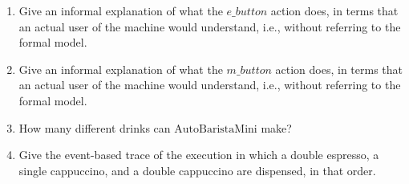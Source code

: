 \documentclass[12pt,fleqn]{article}
\begin{document}
\begin{enumerate}
\begin{enumerate}
\vspace*{1in} %



\item Give an informal explanation of what the $e\_button$ action does, in terms that an actual user of the machine would understand, i.e., without referring to the formal model.

\vspace*{1in} %



\item Give an informal explanation of what the $m\_button$ action does, in terms that an actual user of the machine would understand, i.e., without referring to the formal model.

\vspace*{1in} %



\item How many different drinks can $\mathrm{AutoBaristaMini}$ make?

\vspace*{1in} %



\item Give the event-based trace of the execution in which a double espresso, a single cappuccino, and a double cappuccino are dispensed, in that order.

\vspace*{1in} %

\end{enumerate}


\end{enumerate}
\end{document}
